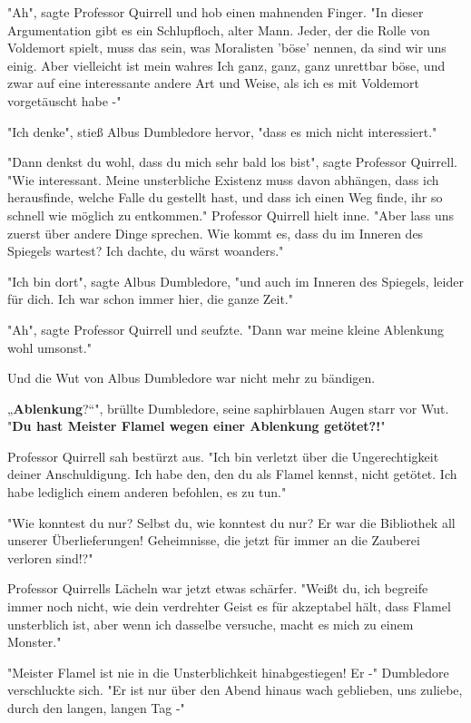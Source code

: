 {"Ah", sagte Professor Quirrell und hob einen mahnenden Finger. "In dieser Argumentation gibt es ein Schlupfloch, alter Mann. Jeder, der die Rolle von Voldemort spielt, muss das sein, was Moralisten 'böse' nennen, da sind wir uns einig. Aber vielleicht ist mein wahres Ich ganz, ganz, ganz unrettbar böse, und zwar auf eine interessante andere Art und Weise, als ich es mit Voldemort vorgetäuscht habe -"

"Ich denke", stieß Albus Dumbledore hervor, "dass es mich nicht interessiert."

"Dann denkst du wohl, dass du mich sehr bald los bist", sagte Professor Quirrell. "Wie interessant. Meine unsterbliche Existenz muss davon abhängen, dass ich herausfinde, welche Falle du gestellt hast, und dass ich einen Weg finde, ihr so schnell wie möglich zu entkommen." Professor Quirrell hielt inne. "Aber lass uns zuerst über andere Dinge sprechen. Wie kommt es, dass du im Inneren des Spiegels wartest? Ich dachte, du wärst woanders."

"Ich bin dort", sagte Albus Dumbledore, "und auch im Inneren des Spiegels, leider für dich. Ich war schon immer hier, die ganze Zeit."

"Ah", sagte Professor Quirrell und seufzte. "Dann war meine kleine Ablenkung wohl umsonst."

Und die Wut von Albus Dumbledore war nicht mehr zu bändigen.

„\textbf{Ablenkung}?“", brüllte Dumbledore, seine saphirblauen Augen starr vor Wut. "\textbf{Du hast Meister Flamel wegen einer Ablenkung getötet?!}"

Professor Quirrell sah bestürzt aus. "Ich bin verletzt über die Ungerechtigkeit deiner Anschuldigung. Ich habe den, den du als Flamel kennst, nicht getötet. Ich habe lediglich einem anderen befohlen, es zu tun."

"Wie konntest du nur? Selbst du, wie konntest du nur? Er war die Bibliothek all unserer Überlieferungen! Geheimnisse, die jetzt für immer an die Zauberei verloren sind!?"

Professor Quirrells Lächeln war jetzt etwas schärfer. "Weißt du, ich begreife immer noch nicht, wie dein verdrehter Geist es für akzeptabel hält, dass Flamel unsterblich ist, aber wenn ich dasselbe versuche, macht es mich zu einem Monster."

"Meister Flamel ist nie in die Unsterblichkeit hinabgestiegen! Er -" Dumbledore verschluckte sich. "Er ist nur über den Abend hinaus wach geblieben, uns zuliebe, durch den langen, langen Tag -"

}
